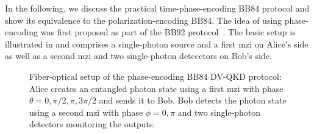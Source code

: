 In the following, we discuss the practical time-phase-encoding BB84 protocol and show its equivalence to the polarization-encoding BB84.
The idea of using phase-encoding was first proposed as part of the BB92 protocol~\cite{Bennett1992}.
The basic setup is illustrated in  and comprises a single-photon source and a first \gls{mzi} on Alice's side as well as a second \gls{mzi} and two single-photon detecctors on Bob's side.
\begin{figure}[htb]
	\centering
	
	\caption{Fiber-optical setup of the phase-encoding BB84 DV-QKD protocol: Alice creates an entangled photon state using a first \gls{mzi} with phase $\theta=0,\pi/2,\pi,3\pi/2$ and sends it to Bob. Bob detects the photon state using a second \gls{mzi} with phase $\phi=0,\pi$ and two single-photon detectors monitoring the outputs.}\label{fig:time_phase_encoding_bb84}
\end{figure}

